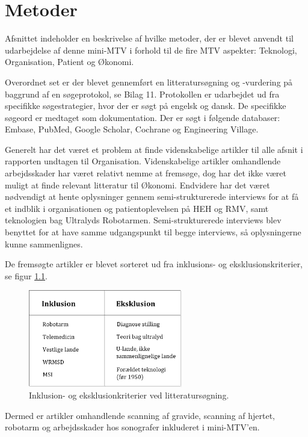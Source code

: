\chapter{Metoder}
Afsnittet indeholder en beskrivelse af hvilke metoder, der er blevet anvendt til udarbejdelse af denne mini-MTV i forhold til de fire MTV aspekter: Teknologi, Organisation, Patient og Økonomi.

Overordnet set er der blevet gennemført en litteratursøgning og -vurdering på baggrund af en søgeprotokol, se Bilag 11. Protokollen er udarbejdet ud fra specifikke søgestrategier, hvor der er søgt på engelsk og dansk. De specifikke søgeord er medtaget som dokumentation. Der er søgt i følgende databaser: Embase, PubMed, Google Scholar, Cochrane og Engineering Village. 

Generelt har det været et problem at finde videnskabelige artikler til alle afsnit i rapporten undtagen til Organisation. Videnskabelige artikler omhandlende arbejdsskader har været relativt nemme at fremsøge, dog har det ikke været muligt at finde relevant litteratur til Økonomi. Endvidere har det været nødvendigt at hente oplysninger gennem semi-strukturerede interviews for at få et indblik i organisationen og patientoplevelsen på HEH og RMV, samt teknologien bag Ultralyds Robotarmen. Semi-strukturerede interviews blev benyttet for at have samme udgangspunkt til begge interviews, så oplysningerne kunne sammenlignes.   

De fremsøgte artikler er blevet sorteret ud fra inklusions- og eksklusionskriterier, se figur \ref{InklusionEksklusion}. 

\begin{figure}[H]\centering
	\includegraphics[width = 0.6\textwidth]{Figurer/InklusionEksklusion}
	\caption{Inklusion- og eksklusionkriterier ved litteratursøgning.}
	\label{InklusionEksklusion}
\end{figure}

Dermed er artikler omhandlende scanning af gravide, scanning af hjertet, robotarm og arbejdsskader hos sonografer inkluderet i mini-MTV'en.

